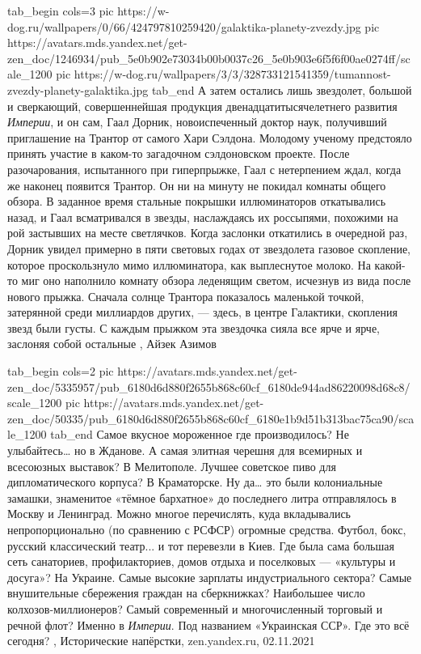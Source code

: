 \ifcmt
  tab_begin cols=3
     pic https://w-dog.ru/wallpapers/0/66/424797810259420/galaktika-planety-zvezdy.jpg
     pic https://avatars.mds.yandex.net/get-zen_doc/1246934/pub_5e0b902e73034b00b0037c26_5e0b903e6f5f6f00ae0274ff/scale_1200
		 pic https://w-dog.ru/wallpapers/3/3/328733121541359/tumannost-zvezdy-planety-galaktika.jpg
  tab_end
\fi
А затем остались лишь звездолет, большой и сверкающий, совершеннейшая продукция
двенадцатитысячелетнего развития \emph{Империи}, и он сам, Гаал Дорник,
новоиспеченный доктор наук, получивший приглашение на Трантор от самого Хари
Сэлдона. Молодому ученому предстояло принять участие в каком-то загадочном
сэлдоновском проекте.  После разочарования, испытанного при гиперпрыжке, Гаал с
нетерпением ждал, когда же наконец появится Трантор. Он ни на минуту не покидал
комнаты общего обзора. В заданное время стальные покрышки иллюминаторов
откатывались назад, и Гаал всматривался в звезды, наслаждаясь их россыпями,
похожими на рой застывших на месте светлячков. Когда заслонки откатились в
очередной раз, Дорник увидел примерно в пяти световых годах от звездолета
газовое скопление, которое проскользнуло мимо иллюминатора, как выплеснутое
молоко. На какой-то миг оно наполнило комнату обзора леденящим светом, исчезнув
из вида после нового прыжка.  Сначала солнце Трантора показалось маленькой
точкой, затерянной среди миллиардов других, — здесь, в центре Галактики,
скопления звезд были густы. С каждым прыжком эта звездочка сияла все ярче и
ярче, заслоняя собой остальные
, Айзек Азимов

\ifcmt
  tab_begin cols=2
     pic https://avatars.mds.yandex.net/get-zen_doc/5335957/pub_6180d6d880f2655b868c60cf_6180de944ad86220098d68c8/scale_1200
     pic https://avatars.mds.yandex.net/get-zen_doc/50335/pub_6180d6d880f2655b868c60cf_6180e1b9d51b313bac75ca90/scale_1200
  tab_end
\fi
Самое вкусное мороженное где производилось? Не улыбайтесь… но в Жданове. А
самая элитная черешня для всемирных и всесоюзных выставок? В Мелитополе. Лучшее
советское пиво для дипломатического корпуса? В Краматорске. Ну да… это были
колониальные замашки, знаменитое «тёмное бархатное» до последнего литра
отправлялось в Москву и Ленинград.  Можно многое перечислять, куда вкладывались
непропорционально (по сравнению с РСФСР) огромные средства. Футбол, бокс,
русский классический театр... и тот перевезли в Киев. Где была сама большая
сеть санаториев, профилакториев, домов отдыха и поселковых — «культуры и
досуга»? На Украине.  Самые высокие зарплаты индустриального сектора? Самые
внушительные сбережения граждан на сберкнижках? Наибольшее число
колхозов-миллионеров? Самый современный и многочисленный торговый и речной
флот? Именно в \emph{Империи}. Под названием «Украинская ССР». Где это всё сегодня?
, 
Исторические напёрстки, zen.yandex.ru, 02.11.2021

